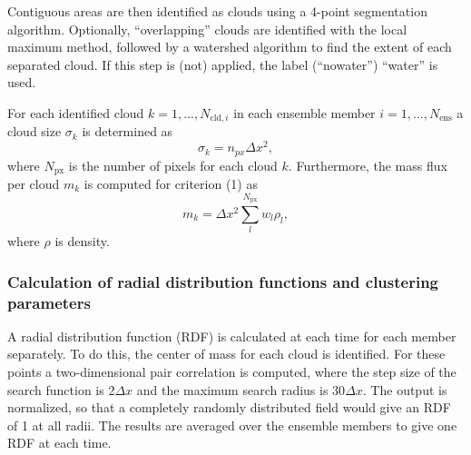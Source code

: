 \documentclass[a4paper, 12pt, draft]{article}
\begin{document}
Contiguous areas are then identified as clouds using a 4-point segmentation algorithm. Optionally, ``overlapping'' clouds are identified with the local maximum method, followed by a watershed algorithm to find the extent of each separated cloud. If this step is (not) applied, the label (``nowater'') ``water'' is used. 

For each identified cloud $k=1,...,N_{\mathrm{cld},i}$ in each ensemble member $i=1,...,N_{\mathrm{ens}}$ a cloud size $\sigma_k$ is determined as
\begin{equation} \label{eq:cld_size}
 \sigma_k = n_{px} \Delta x^2,
\end{equation}
where $N_{\mathrm{px}}$ is the number of pixels for each cloud $k$. Furthermore, the mass flux per cloud $m_k$ is computed for criterion (1) as
\begin{equation} \label{eq:mass_flux_per_cloud}
 m_k = \Delta x^2 \sum_{l}^{N_{\mathrm{px}}} w_l \rho_l,
\end{equation}
where $\rho$ is density.

\subsubsection{Calculation of radial distribution functions and clustering parameters}
A radial distribution function (RDF) is calculated at each time for each member separately. To do this, the center of mass for each cloud is identified. For these points a two-dimensional pair correlation is computed, where the step size of the search function is 2$\Delta x$ and the maximum search radius is 30$\Delta x$. The output is normalized, so that a completely randomly distributed field would give an RDF of 1 at all radii. The results are averaged over the ensemble members to give one RDF at each time. 

\end{document}
